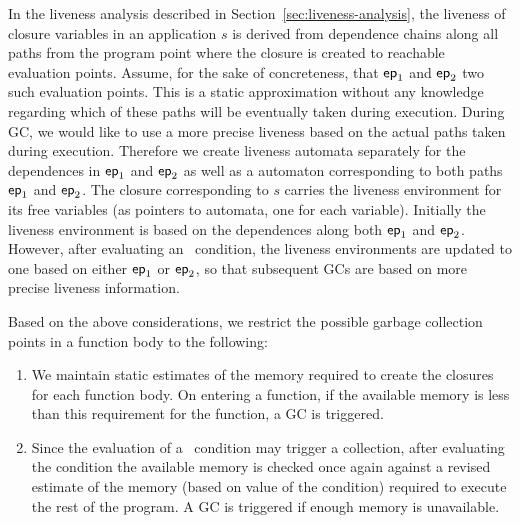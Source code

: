 \documentclass[preprint,9pt]{sigplanconf}
\begin{document}
In        the       liveness        analysis       described        in
Section~\ref{sec:liveness-analysis}, the liveness of closure variables
in  an application  $s$ is  derived from  dependence chains  along all
paths from the program point where the closure is created to reachable
evaluation  points.  Assume,  for   the  sake  of  concreteness,  that
$\mathsf{ep}_1$  and $\mathsf{ep}_2$  two  such evaluation  points.   This is  a
static approximation  without any  knowledge regarding which  of these
paths will be  eventually taken during execution. During  GC, we would
like to use a more precise  liveness based on the  actual
paths  taken  during  execution.    Therefore we create  liveness  automata
separately  for the dependences in   $\mathsf{ep}_1$ and  $\mathsf{ep}_2$  as  well as  a  automaton
corresponding to  both paths  $\mathsf{ep}_1$ and $\mathsf{ep}_2$.   The closure
corresponding to  $s$ carries  the liveness  environment for  its free
variables (as pointers to automata, one for each variable).  Initially
the  liveness  environment is  based  on  the dependences  along  both
$\mathsf{ep}_1$    and   $\mathsf{ep}_2$.    However,   after    evaluating   an
\SIF\ condition, the liveness environments are updated to one based on
either $\mathsf{ep}_1$ or  $\mathsf{ep}_2$, so that subsequent GCs  are based on
more precise liveness information. 

Based on  the above considerations,  we restrict the  possible garbage
collection points in a function body to the following:
\begin{enumerate}
\item We  maintain static estimates  of the memory required  to create
  the closures for each function body.  On entering a function, if the
  available memory is  less than this requirement for  the function, a
  GC is triggered.
\item Since the evaluation of a  \SIF\ condition may trigger a 
  collection, after evaluating the condition   the available memory
  is  checked once  again against  a  revised estimate  of the  memory
  (based on  value of the condition)  required to execute the  rest of
  the program.  A GC is triggered if enough memory is unavailable.
\end{enumerate}



\end{document}
